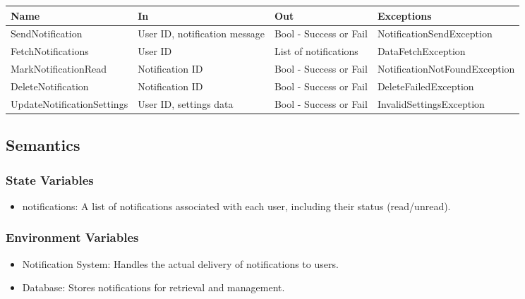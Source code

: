 \documentclass[12pt, titlepage]{article}
\begin{document}
\begin{center}
  \begin{tabular}{p{5cm} p{3cm} p{3cm} p{5cm}}
    \hline
    \textbf{Name}              & \textbf{In}                   & \textbf{Out}           & \textbf{Exceptions}           \\
    \hline
    SendNotification           & User ID, notification message & Bool - Success or Fail & NotificationSendException     \\
    \hline
    FetchNotifications         & User ID                       & List of notifications  & DataFetchException            \\
    \hline
    MarkNotificationRead       & Notification ID               & Bool - Success or Fail & NotificationNotFoundException \\
    \hline
    DeleteNotification         & Notification ID               & Bool - Success or Fail & DeleteFailedException         \\
    \hline
    UpdateNotificationSettings & User ID, settings data        & Bool - Success or Fail & InvalidSettingsException      \\
    \hline
  \end{tabular}
\end{center}

\subsection{Semantics}

\subsubsection{State Variables}

\begin{itemize}
  \item notifications: A list of notifications associated with each user, including their status (read/unread).
\end{itemize}

\subsubsection{Environment Variables}

\begin{itemize}
  \item Notification System: Handles the actual delivery of notifications to users.
  \item Database: Stores notifications for retrieval and management.
\end{itemize}
\end{document}
